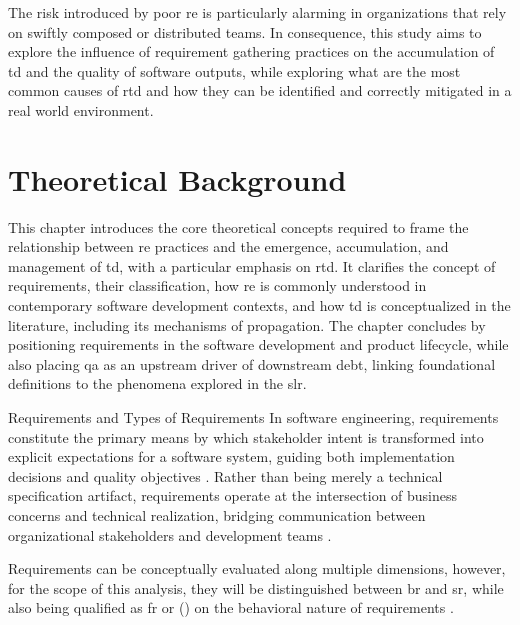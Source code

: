 \documentclass[12pt,reqno, twoside]{amsbook}
\makeatletter
\def\section{\@startsection{section}{1}%
      \z@{.5\linespacing\@plus.7\linespacing}{.25\linespacing}%
      {\normalfont\bfseries\flushleft}}
\theoremstyle{plain}
\numberwithin{equation}{chapter}
\numberwithin{section}{chapter}
\makeatother
\begin{document}
The risk introduced by poor \gls{re} is particularly alarming in organizations that rely on swiftly composed or distributed teams. In consequence, this study aims to explore the influence of requirement gathering practices on the accumulation of \gls{td} and the quality of software outputs, while exploring what are the most common causes of \gls{rtd} and how they can be identified and correctly mitigated in a real world environment. 

\chapter{Theoretical Background}

\noindent This chapter introduces the core theoretical concepts required to frame the relationship between \gls{re} 
practices and the emergence, accumulation, and management of \gls{td}, with a particular emphasis on \gls{rtd}. It 
clarifies the concept of requirements, their classification, how \gls{re} is commonly understood in 
contemporary software development contexts, and how \gls{td} is conceptualized in the literature, including its 
mechanisms of propagation. The chapter concludes by positioning requirements in the software development and product 
lifecycle, while also placing \gls{qa} as an upstream driver of downstream debt, linking foundational definitions to 
the phenomena explored in the \gls{slr}.

\section{Requirements and Types of Requirements}
\noindent In software engineering, requirements constitute the primary means by which stakeholder intent is transformed 
into explicit expectations for a software system, guiding both implementation decisions and quality objectives 
\parencite{Femmer2019}. Rather than being merely a technical specification artifact, requirements operate 
at the intersection of business concerns and technical realization, bridging communication between organizational 
stakeholders and development teams \parencite{Femmer2019, Behutiye2019}. 

Requirements can be conceptually evaluated along multiple dimensions, however, for the scope of this analysis, they will 
be distinguished between \gls{br} and \gls{sr}, while also being qualified as \gls{fr} or  () on the behavioral 
nature of requirements \parencite{SWEBOK2024}.
\end{document}
